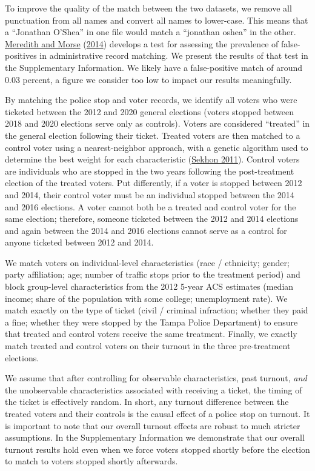\documentclass[
  12pt,
]{article}
\begin{document}
To improve the quality of the match between the two datasets, we remove all punctuation from all names and convert all names to lower-case. This means that a ``Jonathan O'Shea'' in one file would match a ``jonathan oshea'' in the other. \protect\hyperlink{ref-Meredith2014}{Meredith and Morse} (\protect\hyperlink{ref-Meredith2014}{2014}) develops a test for assessing the prevalence of false-positives in administrative record matching. We present the results of that test in the Supplementary Information. We likely have a false-positive match of around 0.03 percent, a figure we consider too low to impact our results meaningfully.

By matching the police stop and voter records, we identify all voters who were ticketed between the 2012 and 2020 general elections (voters stopped between 2018 and 2020 elections serve only as controls). Voters are considered ``treated'' in the general election following their ticket. Treated voters are then matched to a control voter using a nearest-neighbor approach, with a genetic algorithm used to determine the best weight for each characteristic (\protect\hyperlink{ref-Sekhon2011}{Sekhon 2011}). Control voters are individuals who are stopped in the two years following the post-treatment election of the treated voters. Put differently, if a voter is stopped between 2012 and 2014, their control voter must be an individual stopped between the 2014 and 2016 elections. A voter cannot both be a treated and control voter for the same election; therefore, someone ticketed between the 2012 and 2014 elections and again between the 2014 and 2016 elections cannot serve as a control for anyone ticketed between 2012 and 2014.

We match voters on individual-level characteristics (race / ethnicity; gender; party affiliation; age; number of traffic stops prior to the treatment period) and block group-level characteristics from the 2012 5-year ACS estimates (median income; share of the population with some college; unemployment rate). We match exactly on the type of ticket (civil / criminal infraction; whether they paid a fine; whether they were stopped by the Tampa Police Department) to ensure that treated and control voters receive the same treatment. Finally, we exactly match treated and control voters on their turnout in the three pre-treatment elections.

We assume that after controlling for observable characteristics, past turnout, \emph{and} the unobservable characteristics associated with receiving a ticket, the timing of the ticket is effectively random. In short, any turnout difference between the treated voters and their controls is the causal effect of a police stop on turnout. It is important to note that our overall turnout effects are robust to much stricter assumptions. In the Supplementary Information we demonstrate that our overall turnout results hold even when we force voters stopped shortly before the election to match to voters stopped shortly afterwards.
\end{document}
